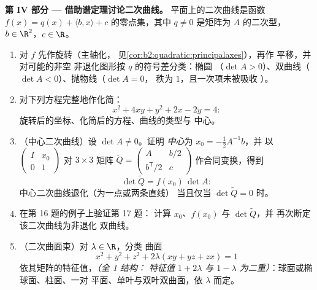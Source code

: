 \begin{problem}
\medskip
\noindent\textbf{第 IV 部分 --- 借助谱定理讨论二次曲线。}
平面上的二次曲线是函数 $f(x) = q(x) + \langle b,
x\rangle + c$ 的零点集，其中 $q \neq 0$ 是矩阵为 $A$ 的二次型，
$b \in \R^2$，$c \in \R$。
\begin{enumerate}[resume]
  \item 对 $f$ 先作旋转（主轴化，
        见\cref{cor:b2:quadratic:principalaxes}），再作
        平移，并对可能的非空
        非退化图形按 $q$ 的符号差分类：椭圆
        （$\det A > 0$）、双曲线（$\det A < 0$）、抛物线（$\det A = 0$，
        秩为 $1$，且一次项未被吸收
        ）。
  \item 对下列方程完整地作化简：
        \[
        x^2 + 4xy + y^2 + 2x - 2y = 4 :
        \]
        旋转后的坐标、化简后的方程、曲线的类型与
        中心。
  \item （中心二次曲线）设 $\det A \neq 0$。证明
        \emph{中心}为 $x_0 = -\frac12 A^{-1}b$，并
        以 $\begin{pmatrix} I & x_0\\ 0 &
        1\end{pmatrix}$ 对 $3\times3$ 矩阵 $\widetilde Q
        = \begin{pmatrix} A & b/2 \\ b^{\mathsf T}/2 &
        c\end{pmatrix}$ 作合同变换，得到
        \[
        \det\widetilde Q = f(x_0)\,\det A :
        \]
        中心二次曲线退化（为一点或两条直线）
        当且仅当 $\det\widetilde Q = 0$ 时。
  \item 在第 16 题的例子上验证第 17 题：
        计算 $x_0$、$f(x_0)$ 与 $\det\widetilde Q$，并
        再次断定该二次曲线为非退化
        双曲线。
  \item （二次曲面束）对 $\lambda \in \R$，分类
        曲面
        \[
        x^2 + y^2 + z^2 + 2\lambda(xy + yz + zx) = 1
        \]
        依其矩阵的特征值，\emph{（全 1 结构：
        特征值 $1 + 2\lambda$ 与 $1 -
        \lambda$ 为二重）}：球面或椭球面、柱面、一对
        平面、单叶与双叶双曲面，依
        $\lambda$ 而定。
\end{enumerate}


\end{problem}
